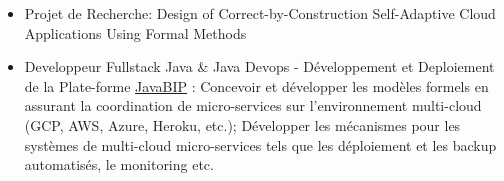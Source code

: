 \documentclass[10pt,a4paper,ragged2e]{altacv}
\begin{document}
	
	
	
	
	\begin{fullwidth}
		\makecvheader
	\end{fullwidth}
	
	
	
	\begin{itemize}
		\item Projet de Recherche: Design of Correct-by-Construction Self-Adaptive Cloud Applications Using Formal Methods
		
		\item Developpeur Fullstack Java \& Java Devops - Développement et Deploiement de la Plate-forme \href{https://github.com/sbliudze/javabip-core}{JavaBIP} : 
		Concevoir et développer les modèles formels en assurant la coordination de micro-services sur l'environnement multi-cloud (GCP, AWS, Azure, Heroku, etc.); Développer les mécanismes pour les systèmes de multi-cloud micro-services tels que les déploiement et les backup automatisés, le monitoring etc.  
	\end{itemize}
	
\end{document}
